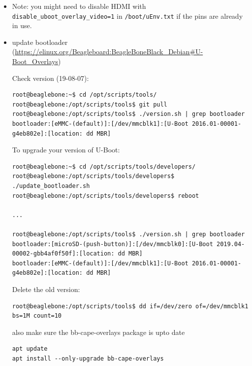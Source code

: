 \documentclass[
	fontsize=10pt
	paper=a4
]{scrartcl}
\begin{document}
\begin{itemize}
\item Note: you might need to disable HDMI with \texttt{disable\_uboot\_overlay\_video=1} in \texttt{/boot/uEnv.txt} if the pins are already in use.

\item update bootloader (\url{https://elinux.org/Beagleboard:BeagleBoneBlack_Debian#U-Boot_Overlays})

Check version (19-08-07):
\begin{lstlisting}
root@beaglebone:~$ cd /opt/scripts/tools/
root@beaglebone:/opt/scripts/tools$ git pull
root@beaglebone:/opt/scripts/tools$ ./version.sh | grep bootloader
bootloader:[eMMC-(default)]:[/dev/mmcblk1]:[U-Boot 2016.01-00001-g4eb802e]:[location: dd MBR]
\end{lstlisting}

To upgrade your version of U-Boot: 
\begin{lstlisting}
root@beaglebone:~$ cd /opt/scripts/tools/developers/
root@beaglebone:/opt/scripts/tools/developers$ ./update_bootloader.sh
root@beaglebone:/opt/scripts/tools/developers$ reboot

...

root@beaglebone:/opt/scripts/tools$ ./version.sh | grep bootloader
bootloader:[microSD-(push-button)]:[/dev/mmcblk0]:[U-Boot 2019.04-00002-gbb4af0f50f]:[location: dd MBR]
bootloader:[eMMC-(default)]:[/dev/mmcblk1]:[U-Boot 2016.01-00001-g4eb802e]:[location: dd MBR]
\end{lstlisting}

Delete the old version:
\begin{lstlisting}
root@beaglebone:/opt/scripts/tools$ dd if=/dev/zero of=/dev/mmcblk1 bs=1M count=10
\end{lstlisting}


also make sure the bb-cape-overlays package is upto date
\begin{lstlisting}
apt update
apt install --only-upgrade bb-cape-overlays
\end{lstlisting}




\end{itemize}
\end{document}
